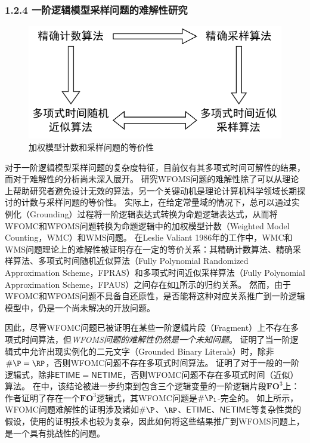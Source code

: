 \documentclass[12pt,UTF8,AutoFakeBold=3,a4paper]{ctexart} %
\newcommand{\fothree}{\ensuremath{\mathbf{FO}^3}}
\begin{document}
\subsubsection{1.2.4 一阶逻辑模型采样问题的难解性研究}

\begin{figure}[b]
	\centering
	\includegraphics[width=.5\textwidth]{figs/counting_sampling_rel.pdf}
	\caption{加权模型计数和采样问题的等价性}
	\label{fig:counting_sampling_equivalence}
 \end{figure}

对于一阶逻辑模型采样问题的复杂度特征，目前仅有其多项式时间可解性的结果，而对于难解性的分析尚未深入展开。
研究WFOMS问题的难解性除了可以从理论上帮助研究者避免设计无效的算法，另一个关键动机是理论计算机科学领域长期探讨的计数与采样问题的等价性。
 实际上，在给定常量域的情况下，总可以通过实例化（Grounding）过程将一阶逻辑表达式转换为命题逻辑表达式，从而将WFOMC和WFOMS问题转换为命题逻辑中的加权模型计数（Weighted Model Counting，WMC）和WMS问题。
在Leslie Valiant 1986年的工作\cite{jerrum_random_1986}中，WMC和WMS问题理论上的难解性被证明存在一定的等价关系：其精确计数算法、精确采样算法、多项式时间随机近似算法（Fully Polynomial Randomized Approximation Scheme，FPRAS）和多项式时间近似采样算法（Fully Polynomial Approximation Scheme，FPAUS）之间存在如\cref{fig:counting_sampling_equivalence}所示的归约关系。
然而，由于WFOMC和WFOMS问题不具备自还原性，是否能将这种对应关系推广到一阶逻辑模型中，仍是一个尚未解决的开放问题。

因此，尽管WFOMC问题已被证明在某些一阶逻辑片段（Fragment）上不存在多项式时间算法，但\emph{WFOMS问题的难解性仍然是一个未知问题}。
证明了当一阶逻辑式中允许出现实例化的二元文字（Grounded Binary Literals）时，除非$\#\P=\RP$，否则WFOMC问题不存在多项式时间算法。
证明了对于一般的一阶逻辑式，除非$\mathsf{ETIME} = \mathsf{NETIME}$，否则WFOMC问题不存在多项式时间（近似）算法。
在中，该结论被进一步约束到包含三个逻辑变量的一阶逻辑片段\fothree{}上：作者证明了存在一个\fothree{}逻辑式，其WFOMC问题是$\#\P_1$-完全的。
如上所示，WFOMC问题难解性的证明涉及诸如$\#\P$、$\RP$、$\mathsf{ETIME}$、$\mathsf{NETIME}$等复杂性类的假设，使用的证明技术也较为复杂，因此如何将这些结果推广到WFOMS问题上，是一个具有挑战性的问题。
\end{document}
